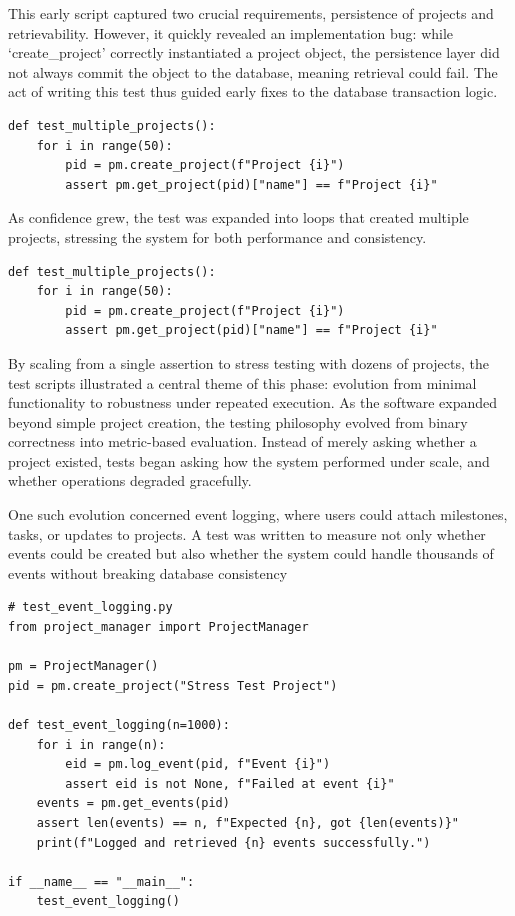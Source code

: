 \documentclass{report}
\begin{document}
This early script captured two crucial requirements, persistence of projects and retrievability. 
However, it quickly revealed an implementation bug: while `create\_project' correctly instantiated a project object, the persistence layer did not always commit the object to the database, meaning retrieval could fail.
The act of writing this test thus guided early fixes to the database transaction logic.

\begin{lstlisting}[style=pythonstyle]
    def test_multiple_projects():
    for i in range(50):
        pid = pm.create_project(f"Project {i}")
        assert pm.get_project(pid)["name"] == f"Project {i}"

\end{lstlisting} 

As confidence grew, the test was expanded into loops that created multiple projects, stressing the system for both performance and consistency.

\begin{lstlisting}[style=pythonstyle]
def test_multiple_projects():
    for i in range(50):
        pid = pm.create_project(f"Project {i}")
        assert pm.get_project(pid)["name"] == f"Project {i}"
\end{lstlisting}    

By scaling from a single assertion to stress testing with dozens of projects, the test scripts illustrated a central theme of this phase: evolution from minimal functionality to robustness under repeated execution.
As the software expanded beyond simple project creation, the testing philosophy evolved from binary correctness into metric-based evaluation. 
Instead of merely asking whether a project existed, tests began asking how the system performed under scale, and whether operations degraded gracefully.

One such evolution concerned event logging, where users could attach milestones, tasks, or updates to projects. 
A test was written to measure not only whether events could be created but also whether the system could handle thousands of events without breaking database consistency

\begin{lstlisting}[style=pythonstyle]
# test_event_logging.py
from project_manager import ProjectManager

pm = ProjectManager()
pid = pm.create_project("Stress Test Project")

def test_event_logging(n=1000):
    for i in range(n):
        eid = pm.log_event(pid, f"Event {i}")
        assert eid is not None, f"Failed at event {i}"
    events = pm.get_events(pid)
    assert len(events) == n, f"Expected {n}, got {len(events)}"
    print(f"Logged and retrieved {n} events successfully.")

if __name__ == "__main__":
    test_event_logging()
\end{lstlisting} 
\end{document}
